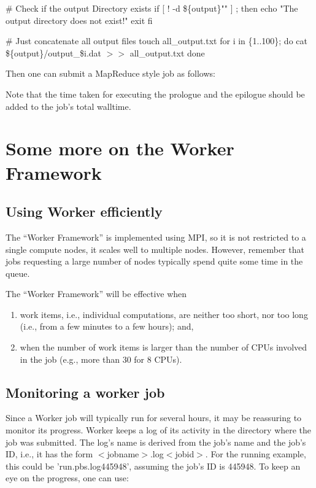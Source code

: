 \begin{description}
\begin{prompt}
\# Check if the output Directory exists
if [ ! -d \$\{output\}"" ] ; then
  echo "The output directory does not exist!"
exit
fi

\# Just concatenate all output files
touch all\_output.txt
for i in \{1..100\};
do
  cat \$\{output\}/output\_\$i.dat $>$$>$ all\_output.txt
done
\end{prompt}

Then one can submit a MapReduce style job as follows:

Note that the time taken for executing the prologue and the epilogue should be added to the job's total walltime.

\section{Some more on the Worker Framework}

\subsection{Using Worker efficiently}

The ``Worker Framework'' is implemented using MPI, so it is not restricted to a single compute nodes, it scales well to multiple nodes. However, remember that jobs requesting a large number of nodes typically spend quite some time in the queue.

The ``Worker Framework'' will be effective when

\begin{enumerate}
\item  work items, i.e., individual computations, are neither too short, nor too long (i.e., from a few minutes to a few hours); and,
\item  when the number of work items is larger than the number of CPUs involved in the job (e.g., more than 30 for 8 CPUs).
\end{enumerate}

\subsection{Monitoring a worker job}

Since a Worker job will typically run for several hours, it may be reassuring to monitor its progress. Worker keeps a log of its activity in the directory where the job was submitted. The log's name is derived from the job's name and the job's ID, i.e., it has the form $<$jobname$>$.log$<$jobid$>$. For the running example, this could be 'run.pbs.log445948', assuming the job's ID is 445948. To keep an eye on the progress, one can use:


\end{description}
